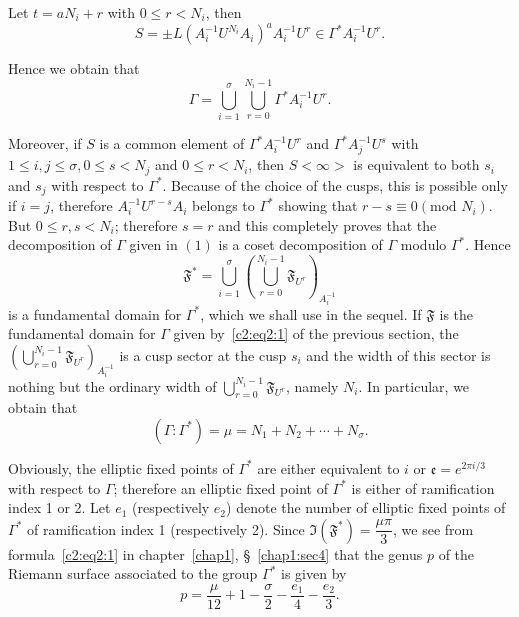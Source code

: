 Let $t=aN_i + r$ with $0\leq r < N_i$, then 
$$
S =\pm L (A^{-1}_i U^{N_i}A_i)^a A^{-1}_i U^r \in
\Gamma^{\ast}A^{-1}_i U^r. 
$$

Hence we obtain that 
\begin{equation*}
\Gamma = \bigcup^{\sigma}_{i=1} \bigcup^{N_i-1}_{r=0} \Gamma^{\ast}
A^{-1}_i U^r. \tag{1}\label{c2:eq2:1}
\end{equation*}

Moreover, if $S$ is a common element of $\Gamma^{\ast} A^{-1}_i U^r$
and $\Gamma^{\ast}A^{-1}_j U^s$ with $1\leq i, j\leq \sigma, 0\leq s <
N_j$ and $0\leq r<N_i$, then $S<\infty>$ is equivalent to both $s_i$
and $s_j$ with respect to $\Gamma^{\ast}$. Because of the choice of
the cusps, this is possible only if $i=j$, therefore $A^{-1}_i
U^{r-s}A_i$ belongs to $\Gamma^{\ast}$ showing that $r-s\equiv 0(\text{mod }
N_i)$. But $0\leq r, s< N_i$; therefore $s=r$ and this completely
proves that the decomposition of $\Gamma$ given in $(1)$ is a coset
decomposition of $\Gamma$ modulo $\Gamma^{\ast}$. Hence
\begin{equation*}
\mathfrak{F}^{\ast} =
\bigcup^{\sigma}_{i=1}\left(\bigcup^{N_i-1}_{r=0}
\mathfrak{F}_{U^r}\right)_{A^{-1}_i} \tag{2}\label{c2:eq2:2}
\end{equation*}
is a fundamental domain for $\Gamma^{\ast}$, which we shall use in the
sequel. If $\mathfrak{F}$ is the fundamental domain for $\Gamma$ given
by~\ref{c2:eq2:1} of the previous section, the $\left(\bigcup\limits^{N_i-1}_{r=0}
\mathfrak{F}_{U^r}\right)_{A^{-1}_i}$ is a cusp sector at the cusp
$s_i$ and the width of this sector is nothing but the ordinary width
of $\bigcup\limits^{N_i-1}_{r=0} \mathfrak{F}_{U^r}$, namely $N_i$. In
particular, we obtain that 
\begin{equation*}
(\Gamma:\Gamma^{\ast}) = \mu = N_1 
+ N_2 + \cdots + N_{\sigma}. \tag{3}\label{c2:eq2:3}
\end{equation*}

Obviously, \pageoriginale the elliptic fixed points of $\Gamma^{\ast}$
are either equivalent to $i$ or $\mathfrak{e}=e^{2\pi i/3}$ with
respect to $\Gamma$; therefore an elliptic fixed point of
$\Gamma^{\ast}$ is either of ramification index 1 or 2. Let $e_1$
(respectively $e_2$) denote the number of elliptic fixed points of
$\Gamma^{\ast}$ of ramification index 1 (respectively 2). Since
$\mathfrak{I}(\mathfrak{F}^{\ast})=\dfrac{\mu\pi}{3}$, we see from
formula~\eqref{c2:eq2:1} in chapter~\ref{chap1}, \S~\ref{chap1:sec4} 
that the genus $p$ of the Riemann
surface associated to the group $\Gamma^{\ast}$ is given by 
$$
p = \frac{\mu}{12} + 1 - \frac{\sigma}{2} - \frac{e_1}{4} - \frac{e_2}{3}.
$$


